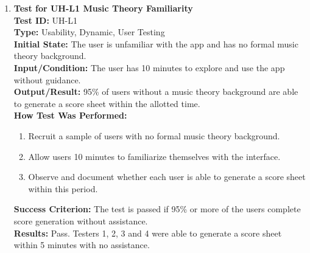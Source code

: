 \documentclass[12pt, titlepage]{article}
\begin{document}
\begin{enumerate}
    \item \textbf{Test for UH-L1 Music Theory Familiarity} \\
      \newline
      \textbf{Test ID:} UH-L1 \\
      \textbf{Type:} Usability, Dynamic, User Testing \\
      \textbf{Initial State:} The user is unfamiliar with the app and has no formal music theory background. \\
      \textbf{Input/Condition:} The user has 10 minutes to explore and use the app without guidance. \\
      \textbf{Output/Result:} 95\% of users without a music theory background are able to generate a score sheet within the allotted 
      time. \\
      \textbf{How Test Was Performed:}
      \begin{enumerate}
          \item Recruit a sample of users with no formal music theory background.
          \item Allow users 10 minutes to familiarize themselves with the interface.
          \item Observe and document whether each user is able to generate a score sheet within this period.
      \end{enumerate}
      \textbf{Success Criterion:} The test is passed if 95\% or more of the users complete score generation without assistance.\\
      \textbf{Results:} Pass. Testers 1, 2, 3 and 4 were able to generate a score sheet within 5 minutes with no assistance.\\


\end{enumerate}
\end{document}
